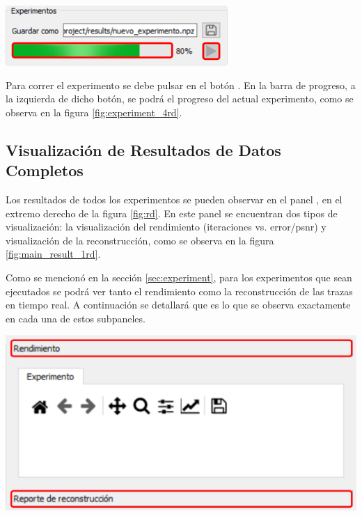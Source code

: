 \documentclass[12pt,twoside,letter]{ol-softwaremanual}
\newcommand*\circled[1]{\tikz[baseline=(char.base)]{
            \node[shape=circle,draw,inner sep=2pt] (char) {#1};}}
\newenvironment{Figure}
  {\par\medskip\noindent\minipage{\linewidth}}
  {\endminipage\par\medskip}
\begin{document}
\begin{multicols}{2}
	
	\begin{Figure}
		\centering
		\includegraphics[width=0.7\linewidth]{experiment-4.png}
		\label{fig:experiment_4rd}
	\end{Figure}
	
	Para correr el experimento se debe pulsar en el botón \hspace{0.5mm} \faPlay \hspace{0.5mm}. En la barra de progreso, a la izquierda de dicho botón, se podrá el progreso del actual experimento, como se observa en la figura \ref{fig:experiment_4rd}.

\end{multicols}

\subsection{Visualización de Resultados de Datos Completos}

Los resultados de todos los experimentos se pueden observar en el panel \circled{6}, en el extremo derecho de la figura \ref{fig:rd}. En este panel se encuentran dos tipos de visualización: la visualización del rendimiento (iteraciones vs. error/psnr) y visualización de la reconstrucción, como se observa en la figura \ref{fig:main_result_1rd}.

\begin{multicols}{2}
	
	Como se mencionó en la sección \ref{sec:experiment}, para los experimentos que sean ejecutados se podrá ver tanto el rendimiento como la reconstrucción de las trazas en tiempo real. A continuación se detallará que es lo que se observa exactamente en cada una de estos subpaneles.
	
	\begin{Figure}
		\centering
		\includegraphics[width=0.7\linewidth]{main-result-1.png}
		\label{fig:main_result_1rd}
	\end{Figure}
	
\end{multicols}
\end{document}
